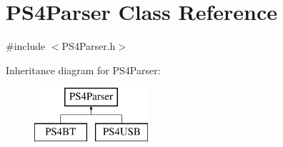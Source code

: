 \hypertarget{class_p_s4_parser}{\section{\-P\-S4\-Parser \-Class \-Reference}
\label{class_p_s4_parser}
}


{\ttfamily \#include $<$\-P\-S4\-Parser.\-h$>$}

\-Inheritance diagram for \-P\-S4\-Parser\-:\begin{figure}[H]
\begin{center}
\leavevmode
\includegraphics[height=2.000000cm]{class_p_s4_parser}
\end{center}
\end{figure}
